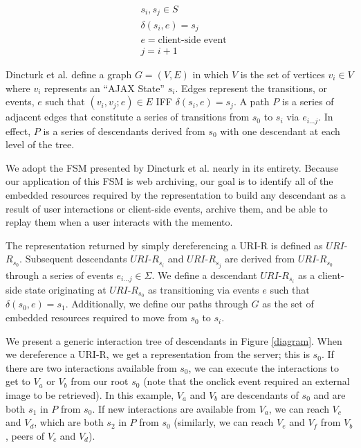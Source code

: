 \documentclass{sig-alternate}
\begin{document}
\begin{equation}
\begin{split} 
&s_i, s_j \in S\\
&\delta(s_i, e) = s_j\\
&e = \text{client-side event}\\
&j = i+1
\end{split}
\label{statedef}
\end{equation}


Dincturk et al. define a graph $G=(V, E)$ in which $V$ is the set of vertices $v_i \in V$ where $v_i$ represents an ``AJAX State'' $s_i$. Edges represent the transitions, or events, $e$ such that $(v_i, v_j;e) \in E$ IFF $\delta(s_i, e)=s_j$. A path $P$ is a series of adjacent edges that constitute a series of transitions from $s_0$ to $s_i$ via $e_{i...j}$. In effect, $P$ is a series of descendants derived from $s_0$ with one descendant at each level of the tree.

We adopt the FSM presented by Dincturk et al. nearly in its entirety. Because our application of this FSM is web archiving, our goal is to identify all of the embedded resources required by the representation to build any descendant as a result of user interactions or client-side events, archive them, and be able to replay them when a user interacts with the memento. 

The representation returned by simply dereferencing a URI-R is defined as $URI$-$R_{s_0}$. Subsequent descendants $URI$-$R_{s_i}$ and $URI$-$R_{s_j}$ are derived from $URI$-$R_{s_0}$ through a series of events $e_{i...j} \in \Sigma$. We define a descendant $URI$-$R_{s_i}$ as a client-side state originating at $URI$-$R_{s_0}$ as transitioning via events $e$ such that $\delta(s_0, e) = s_1$. Additionally, we define our paths through $G$ as the set of embedded resources required to move from $s_0$ to $s_i$.

We present a generic interaction tree of descendants in Figure \ref{diagram}. When we dereference a URI-R, we get a representation from the server; this is $s_0$. If there are two interactions available from $s_0$, we can execute the interactions to get to $V_a$ or $V_b$ from our root $s_0$ (note that the onclick event required an external image to be retrieved). In this example, $V_a$ and $V_b$ are descendants of $s_0$ and are both $s_1$ in $P$ from $s_0$. If new interactions are available from $V_a$, we can reach $V_c$ and $V_d$, which are both $s_2$ in $P$ from $s_0$ (similarly, we can reach $V_e$ and $V_f$ from $V_b$, peers of $V_c$ and $V_d$). 
\end{document}
